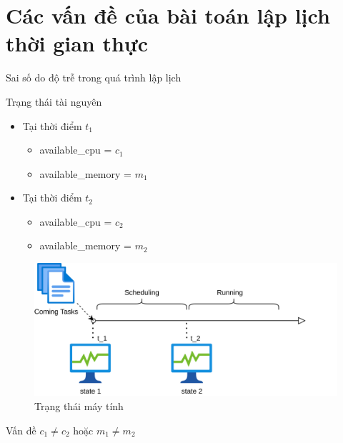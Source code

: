 \documentclass[11pt,xcolor={dvipsnames}, aspectratio=169]{beamer}
\begin{document}
\section{Các vấn đề của bài toán lập lịch thời gian thực}

\begin{frame}
{Sai số do độ trễ trong quá trình lập lịch}
	\begin{minipage}[t]{0.4\linewidth}
		\begin{block}{Trạng thái tài nguyên}
		\begin{itemize}
			\item <2-> Tại thời điểm $t_{1}$
			\begin{itemize}
				\item available\_cpu = $c_{1}$
				\item available\_memory = $m_{1}$
			\end{itemize}
			\item <3-> Tại thời điểm $t_{2}$
			\begin{itemize}
				\item available\_cpu = $c_{2}$
				\item available\_memory = $m_{2}$
			\end{itemize}
		\end{itemize}
		\end{block}
	\end{minipage}
	\hfill
	\begin{minipage}[t]{0.59\linewidth}
		\begin{figure}
			\centering
			\includegraphics[scale=0.5]{images/state_change.png}
			\caption{Trạng thái máy tính}
		\end{figure}
	\end{minipage}
	\pause
	\pause
	\pause
	\begin{center}
		\begin{block}
		{\centering Vấn đề}
				\centering $c_{1} \neq c_{2}$ hoặc $m_{1} \neq m_{2}$
		\end{block}
	\end{center}
\end{frame}
\end{document}
